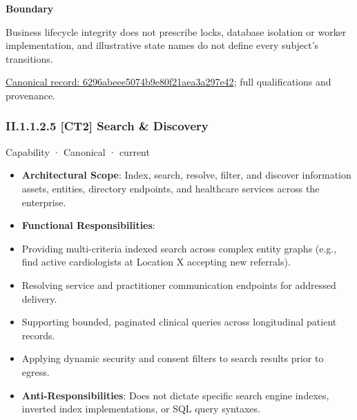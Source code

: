 \textbf{Boundary}



Business lifecycle integrity does not prescribe locks, database isolation or worker implementation, and illustrative state names do not define every subject's transitions.


{\footnotesize \href{../../../../../../../continuum/strategy/capability/6296abeee5074b9e80f21aea3a297e42.md}{Canonical record: 6296abeee5074b9e80f21aea3a297e42}; full qualifications and provenance.}\par
\subsubsection*{II.1.1.2.5 [CT2] Search \& Discovery}
\label{navigation:II.1.1.2.5}

\label{element:6a45701634f04b43919d9152a61e5f2e}
{\small Capability · Canonical · current}\par

\begin{itemize}


\item \textbf{Architectural Scope}: Index, search, resolve, filter, and discover information assets, entities, directory endpoints, and healthcare services across the enterprise.

\item \textbf{Functional Responsibilities}:

\item Providing multi-criteria indexed search across complex entity graphs (e.g., find active cardiologists at Location X accepting new referrals).

\item Resolving service and practitioner communication endpoints for addressed delivery.

\item Supporting bounded, paginated clinical queries across longitudinal patient records.

\item Applying dynamic security and consent filters to search results prior to egress.

\item \textbf{Anti-Responsibilities}: Does not dictate specific search engine indexes, inverted index implementations, or SQL query syntaxes.

\end{itemize}


